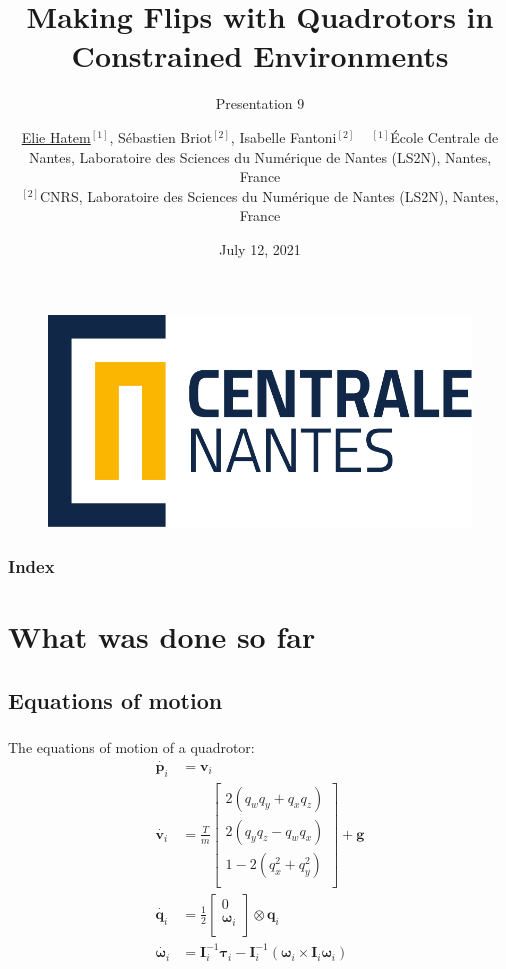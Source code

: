\documentclass[compress, 9pt]{presentation_beamer}
\title{Making Flips with Quadrotors in Constrained Environments}
\subtitle{Presentation 9}
\author[Elie Hatem]{ \underline{Elie Hatem}$^{[1]}$, Sébastien Briot$^{[2]}$, Isabelle Fantoni$^{[2]}$ 
\newline ~ \newline
\footnotesize{
$^{[1]}$École Centrale de Nantes, Laboratoire des Sciences du Numérique de Nantes (LS2N), Nantes, France \\
$^{[2]}$CNRS, Laboratoire des Sciences du Numérique de Nantes (LS2N), Nantes, France \\
}
}
\date{July 12, 2021}
\begin{document}



\begin{frame}[plain]
\begin{figure}
	\centering
	\includegraphics[scale=.25]{media/LogoECN}
\end{figure}
\titlepage
\end{frame}

\begin{frame}
	\frametitle{Index}
	\tableofcontents
\end{frame}


\section{What was done so far}
	\subsection{Equations of motion}
		\begin{frame}
			\frametitle{\subsecname}
			The equations of motion of a quadrotor:
				\begin{align*}
					\dot{\bm{p}_i} &= \bm{v}_i \\
					\dot{\bm{v}_i} &= 
					\frac{T}{m} 
					\begin{bmatrix}
						2 (q_w q_y + q_x q_z) \\
						2 (q_y q_z - q_w q_x) \\
						1 - 2(q_x^2 + q_y^2 ) \\
					\end{bmatrix} + \bm{g} \\			
					\dot{\bm{q}_i} & = \frac{1}{2}
					\begin{bmatrix}
						0 \\
						\bm{\omega}_i \\
					\end{bmatrix} \otimes \bm{q}_i \\
					\dot{\bm{\omega}_i} &= \bm{I}_i^{-1} \bm{\tau}_i - \bm{I}_i^{-1} (\bm{\omega}_i \times \bm{I}_i \bm{\omega}_i)
				\end{align*}
		\end{frame}
\end{document}
